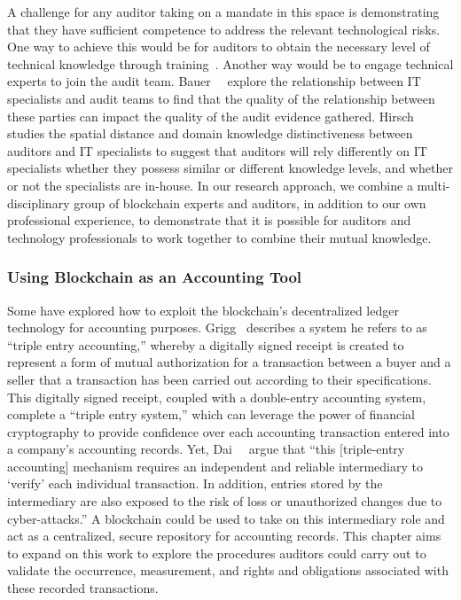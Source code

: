 A challenge for any auditor taking on a mandate in this space is demonstrating that they have sufficient competence to address the relevant technological risks. One way to achieve this would be for auditors to obtain the necessary level of technical knowledge through training~\cite{curtis2009auditors}. Another way would be to engage technical experts to join the audit team. Bauer~\etal~\cite{bauer2019one} explore the relationship between IT specialists and audit teams to find that the quality of the relationship between these parties can impact the quality of the audit evidence gathered. Hirsch~\cite{hirsch2020effect} studies the spatial distance and domain knowledge distinctiveness between auditors and IT specialists to suggest that auditors will rely differently on IT specialists whether they possess similar or different knowledge levels, and whether or not the specialists are in-house. In our research approach, we combine a multi-disciplinary group of blockchain experts and auditors, in addition to our own professional experience, to demonstrate that it is possible for auditors and technology professionals to work together to combine their mutual knowledge.

\subsubsection{Using Blockchain as an Accounting Tool}
Some have explored how to exploit the blockchain's decentralized ledger technology for accounting purposes. Grigg~\cite{grigg2005triple} describes a system he refers to as ``triple entry accounting,'' whereby a digitally signed receipt is created to represent a form of mutual authorization for a transaction between a buyer and a seller that a transaction has been carried out according to their specifications. This digitally signed receipt, coupled with a double-entry accounting system, complete a ``triple entry system,'' which can leverage the power of financial cryptography to provide confidence over each accounting transaction entered into a company's accounting records. Yet, Dai~\etal~\cite{dai2017toward} argue that ``this [triple-entry accounting] mechanism requires an independent and reliable intermediary to ‘verify’ each individual transaction. In addition, entries stored by the intermediary are also exposed to the risk of loss or unauthorized changes due to cyber-attacks.'' A blockchain could be used to take on this intermediary role and act as a centralized, secure repository for accounting records. This chapter aims to expand on this work to explore the procedures auditors could carry out to validate the occurrence, measurement, and rights and obligations associated with these recorded transactions.

